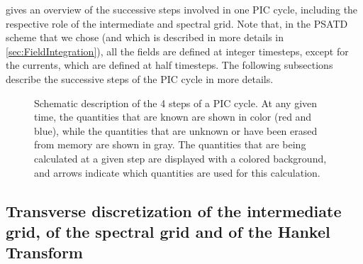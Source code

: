 \documentclass[1p,times,authoryear]{elsarticle}
\begin{document}
 gives an overview of the successive steps
involved in one PIC cycle, including the
respective role of the intermediate and spectral grid. Note that, in the PSATD
scheme that we chose (and which is described in more details in
\cref{sec:FieldIntegration}), all the fields are defined at integer
timesteps, except for the currents, which are defined at half
timesteps. The following subsections describe the successive steps of
the PIC cycle in more details.

\begin{figure}

\caption{\label{fig:GlobalScheme}Schematic description of the 4 steps
  of a PIC
  cycle. At any given time, the quantities that
  are known are shown in color (red and blue), 
while the quantities that are unknown or have been erased from memory 
are shown in gray. The quantities that are being calculated at a given step are
  displayed with a colored background, and arrows indicate which
  quantities are used for this calculation.}
\end{figure}


\subsection{Transverse discretization of the intermediate grid, 
of the spectral grid and of the Hankel Transform}
\label{sec:discretization}
\end{document}

